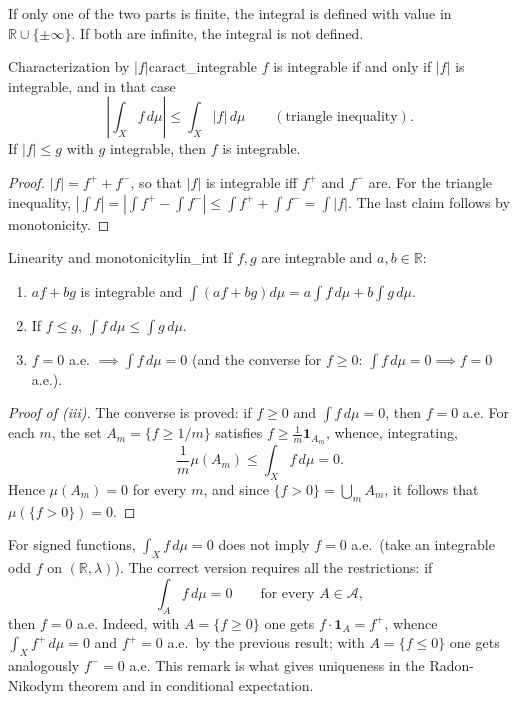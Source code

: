\documentclass[11pt, a4paper]{article}
\begin{document}
\obs If only one of the two parts is finite, the integral is defined with value in $\mathbb{R} \cup
\{\pm\infty\}$. If both are infinite, the integral is not defined.

\begin{proposicion}{Characterization by $|f|$}{caract_integrable}
$f$ is integrable if and only if $|f|$ is integrable, and in that case
$$ \left| \int_X f \, d\mu \right| \le \int_X |f| \, d\mu \qquad (\text{triangle inequality}). $$
If $|f| \le g$ with $g$ integrable, then $f$ is integrable.
\end{proposicion}

\begin{proof}
$|f| = f^+ + f^-$, so that $|f|$ is integrable iff $f^+$ and $f^-$ are. For the triangle inequality,
$|\int f| = |\int f^+ - \int f^-| \le \int f^+ + \int f^- = \int |f|$. The last claim
follows by monotonicity.
\end{proof}

\begin{proposicion}{Linearity and monotonicity}{lin_int}
If $f, g$ are integrable and $a, b \in \mathbb{R}$:
\begin{enumerate}
    \item $af + bg$ is integrable and $\int (af + bg) d\mu = a \int f \, d\mu + b \int g \, d\mu$.
    \item If $f \le g$, $\int f \, d\mu \le \int g \, d\mu$.
    \item $f = 0$ a.e. $\implies \int f \, d\mu = 0$ (and the converse for $f \ge 0$:
    $\int f \, d\mu = 0 \implies f = 0$ a.e.).
\end{enumerate}
\end{proposicion}

\begin{proof}[Proof of (iii)]
The converse is proved: if $f \ge 0$ and $\int f \, d\mu = 0$, then $f = 0$ a.e. For each $m$,
the set $A_m = \{f \ge 1/m\}$ satisfies $f \ge \tfrac{1}{m} \mathbf{1}_{A_m}$, whence, integrating,
$$ \frac{1}{m} \mu(A_m) \le \int_X f \, d\mu = 0. $$
Hence $\mu(A_m) = 0$ for every $m$, and since $\{f > 0\} = \bigcup_m A_m$, it follows that
$\mu(\{f > 0\}) = 0$.
\end{proof}

\obs For signed functions, $\int_X f \, d\mu = 0$ does not imply $f = 0$ a.e.\ (take an
integrable odd $f$ on $(\mathbb{R}, \lambda)$). The correct version requires all the
restrictions: if
$$ \int_A f \, d\mu = 0 \qquad \text{for every } A \in \mathcal{A}, $$
then $f = 0$ a.e. Indeed, with $A = \{f \ge 0\}$ one gets $f \cdot \mathbf{1}_A = f^+$,
whence $\int_X f^+ \, d\mu = 0$ and $f^+ = 0$ a.e.\ by the previous result; with
$A = \{f \le 0\}$ one gets analogously $f^- = 0$ a.e. This remark is what gives
uniqueness in the Radon-Nikodym theorem and in conditional expectation.
\end{document}
